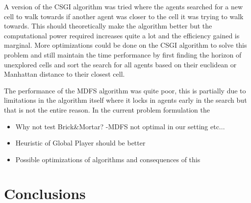 \documentclass{article}
\begin{document}
A version of the CSGI algorithm was tried where the agents searched for a new cell to walk towards if another agent was closer to the cell it was trying to walk towards. This should theoretically make the algorithm better but the computational power required increases quite a lot and the efficiency gained is marginal. More optimizations could be done on the CSGI algorithm to solve this problem and still maintain the time performance by first finding the horizon of unexplored cells and sort the search for all agents based on their euclidean or Manhattan distance to their closest cell.

The performance of the MDFS algorithm was quite poor, this is partially due to
limitations in the algorithm itself where it locks in agents early in the
search but that is not the entire reason. In the current problem formulation the 


\begin{itemize}
    \item Why not test Brick\&Mortar? -MDFS not optimal in our setting etc...
    \item Heuristic of Global Player should be better
    \item Possible optimizations of algorithms and consequences of this
\end{itemize}

\section{Conclusions}




\end{document}
